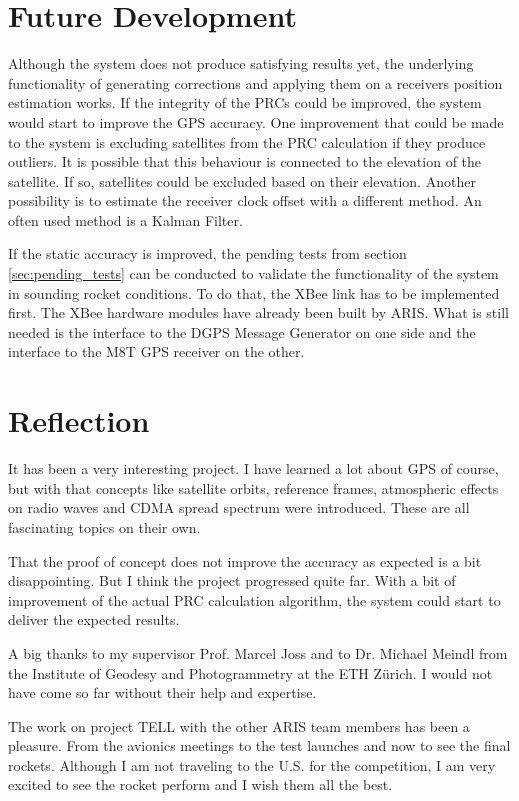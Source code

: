 \section{Future Development}

Although the system does not produce satisfying results yet, the underlying functionality of generating corrections and applying them on a receivers position estimation works.
If the integrity of the PRCs could be improved, the system would start to improve the GPS accuracy.
One improvement that could be made to the system is excluding satellites from the PRC calculation if they produce outliers.
It is possible that this behaviour is connected to the elevation of the satellite.
If so, satellites could be excluded based on their elevation.
Another possibility is to estimate the receiver clock offset with a different method.
An often used method is a Kalman Filter.

If the static accuracy is improved, the pending tests from section \ref{sec:pending_tests} can be conducted to validate the functionality of the system in sounding rocket conditions.
To do that, the XBee link has to be implemented first.
The XBee hardware modules have already been built by ARIS.
What is still needed is the interface to the DGPS Message Generator on one side and the interface to the M8T GPS receiver on the other.


\section{Reflection}

It has been a very interesting project.
I have learned a lot about GPS of course, but with that concepts like satellite orbits, reference frames, atmospheric effects on radio waves and CDMA spread spectrum were introduced. 
These are all fascinating topics on their own.

That the proof of concept does not improve the accuracy as expected is a bit disappointing.
But I think the project progressed quite far.
With a bit of improvement of the actual PRC calculation algorithm, the system could start to deliver the expected results.

A big thanks to my supervisor Prof. Marcel Joss and to Dr. Michael Meindl from the Institute of Geodesy and Photogrammetry at the ETH Z\"urich.
I would not have come so far without their help and expertise.

The work on project TELL with the other ARIS team members has been a pleasure.
From the avionics meetings to the test launches and now to see the final rockets.
Although I am not traveling to the U.S. for the competition, I am very excited to see the rocket perform and I wish them all the best.
